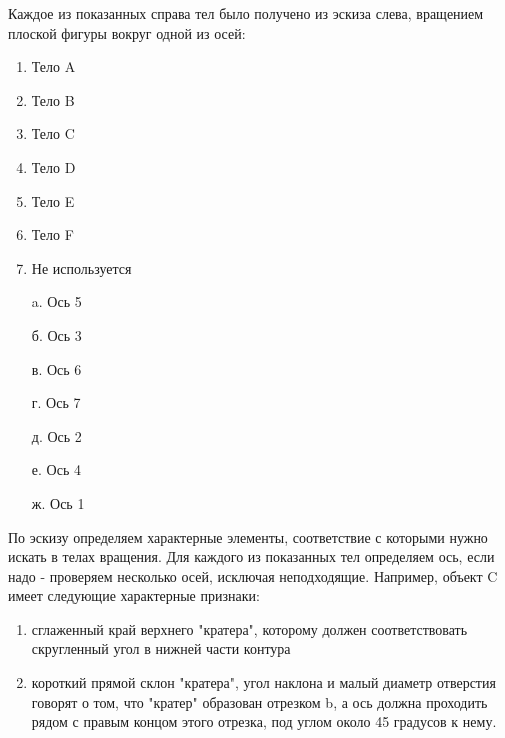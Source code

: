 
Каждое из показанных справа тел было получено из эскиза слева, вращением плоской фигуры вокруг одной из осей:  


\begin{multicols}{2}
    {
        \begin{enumerate}
            \item Тело A
            \item Тело B
            \item Тело C
            \item Тело D
            \item Тело E
            \item Тело F
            \item Не используется
        \end{enumerate}
    }
    {
        \begin{enumerate}
            \item[a.] Ось 5
            \item[б.] Ось 3
            \item[в.] Ось 6
            \item[г.] Ось 7
            \item[д.] Ось 2
            \item[е.] Ось 4
            \item[ж.] Ось 1      
        \end{enumerate}
    }
\end{multicols}

\solutionSection

По эскизу определяем характерные элементы, соответствие с которыми нужно искать в телах вращения. Для каждого из показанных тел определяем ось, если надо - проверяем несколько осей, исключая неподходящие.  Например, объект C имеет следующие характерные признаки:
\begin{enumerate}
    \item сглаженный край верхнего "кратера", которому должен соответствовать скругленный угол в нижней части контура
    \item короткий прямой склон "кратера", угол наклона и малый диаметр отверстия говорят о том, что "кратер" образован отрезком b, а ось должна проходить рядом с правым концом этого отрезка, под углом около 45 градусов к нему.
\end{enumerate}


